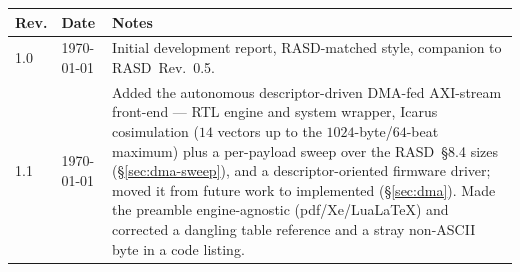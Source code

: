 \documentclass[11pt,a4paper]{article}
\begin{document}
\begin{center}
\begin{tabular}{lll}
\toprule
\rowcolor{tabhead!20}\textbf{Rev.} & \textbf{Date} & \textbf{Notes}\\
\midrule
1.0 & \today & Initial development report, RASD-matched style, companion to RASD~Rev.~0.5.\\
1.1 & \today & Added the autonomous descriptor-driven DMA-fed AXI-stream front-end --- RTL engine and system wrapper, Icarus cosimulation ($14$ vectors up to the $1024$-byte/$64$-beat maximum) plus a per-payload sweep over the RASD~§8.4 sizes (§\ref{sec:dma-sweep}), and a descriptor-oriented firmware driver; moved it from future work to implemented (§\ref{sec:dma}). Made the preamble engine-agnostic (pdf/Xe/Lua\LaTeX) and corrected a dangling table reference and a stray non-ASCII byte in a code listing.\\
\bottomrule
\end{tabular}
\end{center}
\end{document}
